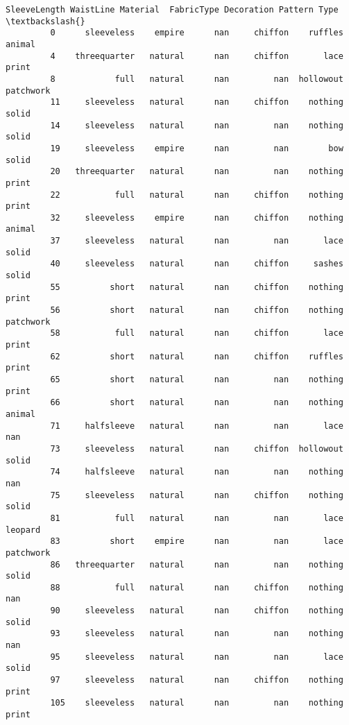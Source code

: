 \documentclass[11pt]{article}
\begin{document}
\begin{Verbatim}[commandchars=\\\{\}]
              SleeveLength WaistLine Material  FabricType Decoration Pattern Type  \textbackslash{}
         0      sleeveless    empire      nan     chiffon    ruffles       animal   
         4    threequarter   natural      nan     chiffon       lace        print   
         8            full   natural      nan         nan  hollowout    patchwork   
         11     sleeveless   natural      nan     chiffon    nothing        solid   
         14     sleeveless   natural      nan         nan    nothing        solid   
         19     sleeveless    empire      nan         nan        bow        solid   
         20   threequarter   natural      nan         nan    nothing        print   
         22           full   natural      nan     chiffon    nothing        print   
         32     sleeveless    empire      nan     chiffon    nothing       animal   
         37     sleeveless   natural      nan         nan       lace        solid   
         40     sleeveless   natural      nan     chiffon     sashes        solid   
         55          short   natural      nan     chiffon    nothing        print   
         56          short   natural      nan     chiffon    nothing    patchwork   
         58           full   natural      nan     chiffon       lace        print   
         62          short   natural      nan     chiffon    ruffles        print   
         65          short   natural      nan         nan    nothing        print   
         66          short   natural      nan         nan    nothing       animal   
         71     halfsleeve   natural      nan         nan       lace          nan   
         73     sleeveless   natural      nan     chiffon  hollowout        solid   
         74     halfsleeve   natural      nan         nan    nothing          nan   
         75     sleeveless   natural      nan     chiffon    nothing        solid   
         81           full   natural      nan         nan       lace      leopard   
         83          short    empire      nan         nan       lace    patchwork   
         86   threequarter   natural      nan         nan    nothing        solid   
         88           full   natural      nan     chiffon    nothing          nan   
         90     sleeveless   natural      nan     chiffon    nothing        solid   
         93     sleeveless   natural      nan         nan    nothing          nan   
         95     sleeveless   natural      nan         nan       lace        solid   
         97     sleeveless   natural      nan     chiffon    nothing        print   
         105    sleeveless   natural      nan         nan    nothing        print   

\end{Verbatim}
\end{document}
